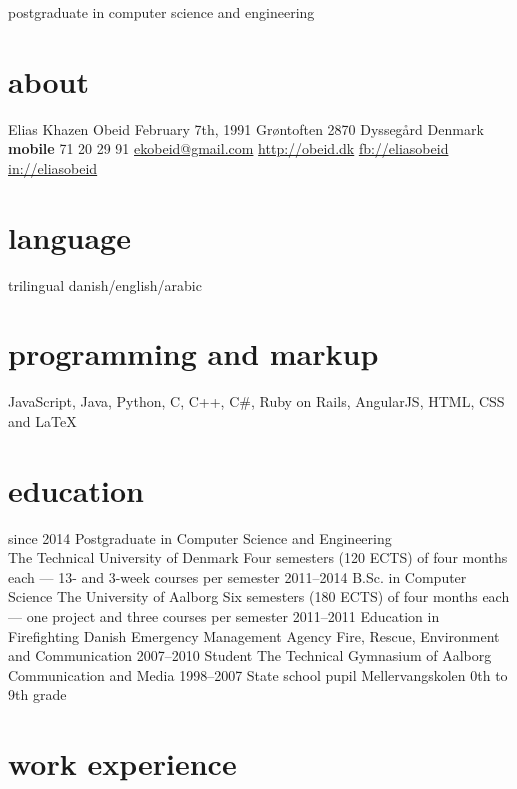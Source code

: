 \documentclass[print]{friggeri-cv}
\begin{document}
    {postgraduate in computer science and engineering}

\begin{aside}
  \section{about}
    Elias Khazen Obeid
    February 7th, 1991
    Grøntoften 
    2870 Dyssegård
    Denmark
    ~
    \textbf{mobile} 71 20 29 91
    \href{mailto:ekobeid@gmail.com}{ekobeid@gmail.com}
    \href{http://obeid.dk}{http://obeid.dk}
    \href{http://facebook.com/eliaskhazenobeid}{fb://eliasobeid}
    \href{http://www.linkedin.com/in/eliasobeid}{in://eliasobeid}
  \section{language}
    trilingual danish/english/arabic
  \section{programming and markup}
    JavaScript, Java,
    Python, C, C++, C\#,
    Ruby on Rails,
    AngularJS,
    HTML, CSS and \LaTeX{}
\end{aside}

\section{education}

\begin{entrylist}
  \entry
    {since 2014}
    {Postgraduate {\normalfont in Computer Science and Engineering}\\}
    {The Technical University of Denmark}
    {Four semesters (120 ECTS) of four months each --- 13- and 3-week courses per semester}
  \entry
    {2011–2014}
    {B.Sc. {\normalfont in Computer Science}}
    {The University of Aalborg}
    {Six semesters (180 ECTS) of four months each --- one project and three courses per semester}
  \entry
    {2011–2011}
    {Education in Firefighting}
    {Danish Emergency Management Agency}
    {Fire, Rescue, Environment and Communication}
  \entry
    {2007–2010}
    {Student}
    {The Technical Gymnasium of Aalborg}
    {Communication and Media}
  \entry
    {1998–2007}
    {State school pupil}
    {Mellervangskolen}
    {0th to 9th grade}
\end{entrylist}

\section{work experience}
\end{document}
